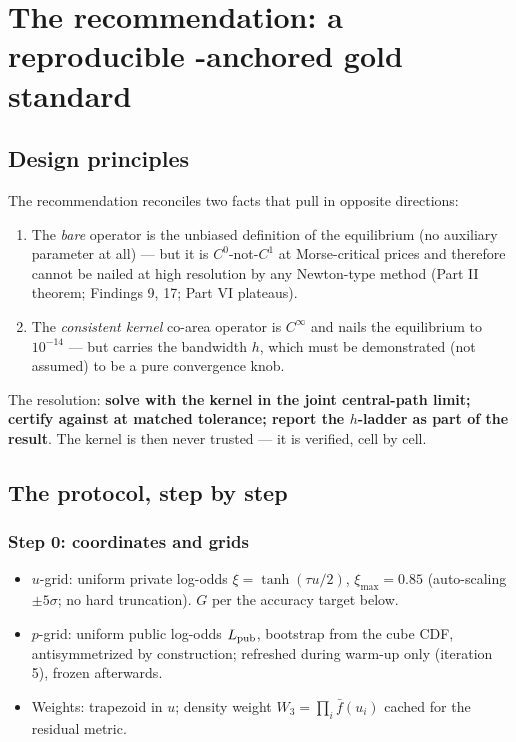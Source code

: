 \part{The recommendation: a reproducible \strict{}-anchored gold standard}

\chapter{Design principles}

The recommendation reconciles two facts that pull in opposite
directions:
\begin{enumerate}\itemsep2pt
  \item The \emph{bare} \strict{} operator is the unbiased definition
        of the equilibrium (no auxiliary parameter at all) --- but it is
        $C^0$-not-$C^1$ at Morse-critical prices and therefore cannot
        be nailed at high resolution by any Newton-type method
        (Part II theorem; Findings 9, 17; Part VI plateaus).
  \item The \emph{consistent kernel} co-area operator is $C^\infty$ and
        nails the equilibrium to $10^{-14}$ --- but carries the
        bandwidth $h$, which must be demonstrated (not assumed) to be a
        pure convergence knob.
\end{enumerate}
The resolution: \textbf{solve with the kernel in the joint central-path
limit; certify against \strict{} at matched tolerance; report the
$h$-ladder as part of the result}. The kernel is then never trusted ---
it is verified, cell by cell.

\chapter{The protocol, step by step}

\section{Step 0: coordinates and grids}
\begin{itemize}\itemsep2pt
  \item $u$-grid: uniform private log-odds $\xi = \tanh(\tau u/2)$,
        $\xi_{\max} = 0.85$ (auto-scaling $\pm 5\sigma$; no hard
        truncation). $G$ per the accuracy target below.
  \item $p$-grid: uniform public log-odds $L_{\rm pub}$, bootstrap from the
        cube CDF, antisymmetrized by construction; refreshed during
        warm-up only (iteration 5), frozen afterwards.
  \item Weights: trapezoid in $u$; density weight
        $W_3 = \prod_i \bar f(u_i)$ cached for the residual metric.
\end{itemize}

